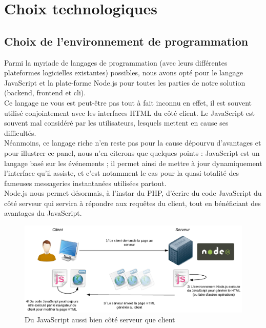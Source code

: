 \section{Choix technologiques}
\label{section:choixTechnologiques}

\subsection*{Choix de l'environnement de programmation}

Parmi la myriade de langages de programmation (avec leurs différentes plateformes logicielles existantes) possibles, nous avons opté pour le langage JavaScript et la plate-forme Node.js pour toutes les parties de notre solution (\gls{backend}, \gls{frontend} et \Gls{cli}). \\

Ce langage ne vous est peut-être pas tout à fait inconnu en effet, il est souvent utilisé conjointement avec les interfaces HTML du côté client. Le JavaScript est souvent mal considéré par les utilisateurs, lesquels mettent en cause ses difficultés. \\

Néanmoins, ce langage riche n’en reste pas pour la cause dépourvu d’avantages et pour illustrer ce panel, nous n'en citerons que quelques points : JavaScript est un langage basé sur les événements ; il permet ainsi de mettre à jour dynamiquement l’interface qu’il assiste, et c’est notamment le cas pour la quasi-totalité des fameuses messageries instantanées utilisées partout.\\

Node.js nous permet désormais, à l'instar du PHP, d'écrire du code JavaScript du côté serveur qui servira à répondre aux requêtes du client, tout en bénéficiant des avantages du JavaScript. \\

\begin{figure}[H]
    \includegraphics[width=\textwidth,height=0.24\textheight,keepaspectratio]{images/SchemaNodejs.png}
    \centering
    \caption[Du JavaScript aussi bien côté serveur que client]{Du JavaScript aussi bien côté serveur que client~\cite{NodejsIllustrations}}
    \label{pic:WhatIsNodeJs}
\end{figure}

